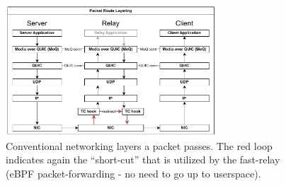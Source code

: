 \vspace{0.5cm}
\begin{figure}[htbp] %
    \centering
    \includegraphics[width=0.7\textwidth]{figures/02_background/route-layering.drawio.pdf}
    \caption[Packet path schematic regarding network stack]{Conventional networking layers a packet passes.
    The red loop indicates again the ``short-cut'' that is utilized by the fast-relay 
    (eBPF packet-forwarding {-} no need to go up to userspace).}\label{fig:route-layering}
\end{figure}